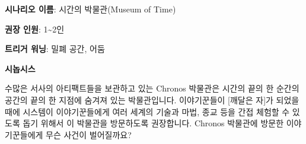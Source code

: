 \documentclass{report}
\begin{document}
	\textbf{시나리오 이름}: 시간의 박물관(Museum of Time)
	
	\textbf{권장 인원}: 1\textasciitilde2인
	
	\textbf{트리거 워닝}: 밀폐 공간, 어둠
	
	\textbf{시놉시스}
	
	수많은 서사의 아티팩트들을 보관하고 있는 Chronos 박물관은 시간의 끝의 한 순간의 공간의 끝의 한 지점에 숨겨져 있는 박물관입니다. 이야기꾼들이 [깨달은 자]가 되었을 때에 시스템이 이야기꾼들에게 여러 세계의 기술과 마법, 종교 등을 간접 체험할 수 있도록 돕기 위해서 이 박물관을 방문하도록 권장합니다. Chronos 박물관에 방문한 이야기꾼들에게 무슨 사건이 벌어질까요?
\end{document}

